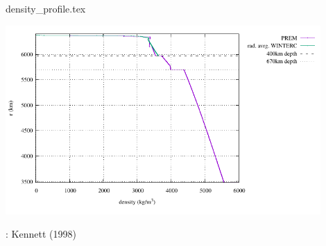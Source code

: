 \begin{flushright} {\tiny {\color{gray} density\_profile.tex}} \end{flushright}

\includegraphics[width=12cm]{images/density_profile/density_profile}

\Literature: Kennett (1998) \cite{kenn98}
